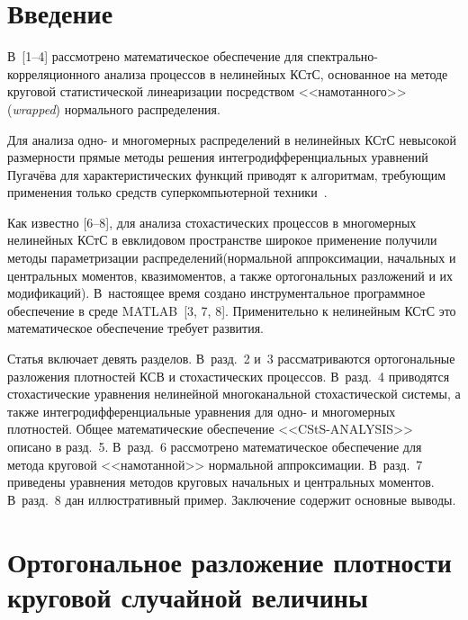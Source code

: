       \begin{multicols}{2}
      
            \label{st\stat}


\section{Введение}

В~[1--4] рассмотрено математическое обеспечение для 
спектрально-корреляционного анализа процессов в нелинейных КСтС, 
основанное на методе круговой статистической 
линеаризации посредством <<намотанного>> (\textit{wrapped}) нормального распределения.

Для анализа одно- и многомерных распределений в нелинейных 
КСтС невысокой размерности прямые методы решения интегродифференциальных уравнений Пугачёва 
для характеристических функций приводят к алгоритмам, требующим применения только средств 
суперкомпьютерной техники~\cite{5s}.

Как известно [6--8], для анализа стохастических процессов в многомерных нелинейных 
КСтС в евкли\-довом пространстве широкое применение получили методы параметризации 
распределений\linebreak (нормальной аппроксимации, начальных и центральных моментов, квазимоментов, 
а также ортогональ\-ных разложений и их модификаций). В~настоящее время создано инструментальное 
программное обеспечение в среде MATLAB~[3, 7, 8]. Применительно к нелинейным 
КСтС это математическое обеспечение требует развития.

Статья включает девять разделов. В~разд.~2 и~3 рассматриваются 
ортогональные разложения плотностей КСВ и стохастических процессов. 
В~разд.~4 приводятся стохастические уравнения нелинейной многоканальной стохастической сис\-те\-мы, 
а также интегродифференциальные уравнения для одно- и многомерных плотностей. 
Общее математические обеспечение <<CStS-ANALYSIS>> описано в разд.~5. В~разд.~6 
рассмотрено математическое обеспечение для метода круговой <<намотанной>> нормальной 
аппроксимации. В~разд.~7 приведены уравнения методов круговых начальных и центральных моментов. 
В~разд.~8 дан иллюстративный пример. Заключение содержит основные выводы.

\vspace*{-6pt}

\section{Ортогональное разложение плотности круговой случайной величины}


\end{multicols}
